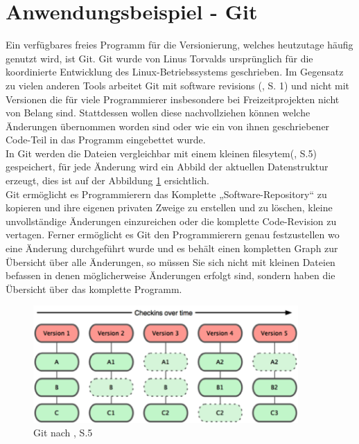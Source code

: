 \section{Anwendungsbeispiel - Git}
Ein verfügbares freies Programm für die Versionierung, welches heutzutage häufig genutzt wird, ist Git. Git wurde von Linus Torvalds ursprünglich für die koordinierte Entwicklung des Linux-Betriebssystems geschrieben. Im Gegensatz zu vielen anderen Tools arbeitet Git mit \Gu software revisions \Go (\cite{git_tool}, S. 1) und nicht mit Versionen die für viele Programmierer insbesondere bei Freizeitprojekten nicht von Belang sind. Stattdessen wollen diese nachvollziehen können welche Änderungen übernommen worden sind oder wie ein von ihnen geschriebener Code-Teil in das Programm eingebettet wurde.
\\
In Git werden die Dateien vergleichbar mit einem kleinen \Gu filesytem\Go (\cite{git_scm}, S.5) gespeichert, für jede Änderung wird ein Abbild der aktuellen Datenstruktur erzeugt, dies ist auf der  Abbildung \ref{fig:git} ersichtlich.
\\
Git ermöglicht es Programmierern das Komplette „Software-Repository“ zu kopieren und ihre eigenen privaten Zweige zu erstellen und zu löschen, kleine unvollständige Änderungen einzureichen oder die komplette Code-Revision zu vertagen. Ferner ermöglicht es Git den Programmierern genau festzustellen wo eine Änderung durchgeführt wurde und es behält einen kompletten Graph zur Übersicht über alle Änderungen, so müssen Sie sich nicht mit kleinen Dateien befassen in denen möglicherweise Änderungen erfolgt sind, sondern haben die Übersicht über das komplette Programm. 
\begin{figure}[H]
	\includegraphics[width=0.9\textwidth]{img/git.png}
	\caption{Git nach \cite{git_scm}, S.5}
	\label{fig:git}
\end{figure}


